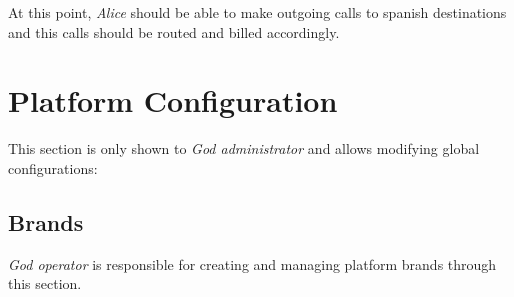 \documentclass[letterpaper,10pt,spanish]{sphinxmanual}
\begin{document}
At this point, \emph{Alice} should be able to make outgoing calls to
spanish destinations and this calls should be routed and billed accordingly.


\chapter{Platform Configuration}
\label{administration_portal/platform/index::doc}\label{administration_portal/platform/index:platform-configuration}
This section is only shown to \emph{God administrator} and allows modifying global configurations:


\section{Brands}
\label{administration_portal/platform/brands:brands}\label{administration_portal/platform/brands::doc}\label{administration_portal/platform/brands:id1}
\emph{God operator} is responsible for creating and managing platform brands through this section.
\end{document}
